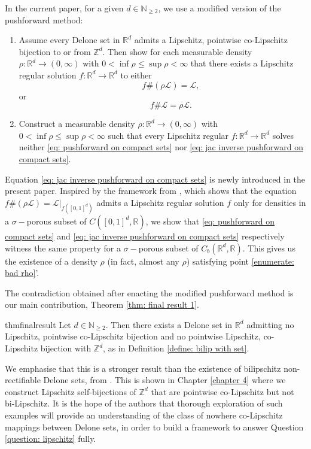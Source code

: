 \documentclass{article}
\newcommand{\R}{\mathbb{R}}
\newcommand{\Z}{\mathbb{Z}}
\newcommand{\N}{\mathbb{N}}
\newcommand{\leb}{\mc{L}}
\newcommand{\mc}[1]{\mathcal{#1}}
\begin{document}
In the current paper, for a given $d \in \N_{\geq 2}$, we use a modified version of the pushforward method:
\begin{enumerate}[(A')] 
    \item \label{enumerate: assumption} \label{enumerate: pushforward restriction} Assume every Delone set in $\R^d$ admits a Lipschitz, pointwise co-Lipschitz bijection to or from $\Z^d$.
    Then show for each measurable density $\rho:\R^d\to (0,\infty)$ with $0 < \inf \rho \leq \sup \rho < \infty$ that there exists a Lipschitz regular solution $f:\R^d \to \R^d$ to either
    \begin{equation} \label{eq: pushforward on compact sets}
        \qquad f\#(\rho \leb) = \leb,
    \end{equation} 
or 
 \begin{equation} \label{eq: jac inverse pushforward on compact sets}
        \qquad f\#\leb = \rho\leb.
    \end{equation}
    \item \label{enumerate: bad rho} Construct a measurable density $\rho:\R^d \to (0,\infty)$ with $0 < \inf \rho \leq \sup \rho < \infty$ such that every Lipschitz regular $f:\R^d \to \R^d$ solves neither \eqref{eq: pushforward on compact sets} nor \eqref{eq: jac inverse pushforward on compact sets}.
\end{enumerate}

Equation \eqref{eq: jac inverse pushforward on compact sets} is newly introduced in the present paper. Inspired by the framework from \cite{dymond2018mapping}, which shows that the equation $f\#(\rho \leb) = \leb|_{f([0,1]^d)}$ admits a Lipschitz regular solution $f$ only for densities in a $\sigma-$porous subset of $C([0,1]^d,\R)$, we show that \eqref{eq: pushforward on compact sets} and \eqref{eq: jac inverse pushforward on compact sets} respectively witness the same property for a $\sigma-$porous subset of $C_b(\R^d,\R)$. This gives us the existence of a density $\rho$ (in fact, almost any $\rho$) satisfying point \ref{enumerate: bad rho}'.

The contradiction obtained after enacting the modified pushforward method is our main contribution, Theorem \ref{thm: final result 1}.
\begin{restatable}{thm}{finalresult} \label{thm: final result 1}Let $d \in \N_{\geq 2}.$ Then there exists a Delone set in $\R^d$ admitting no Lipschitz, pointwise co-Lipschitz bijection and no pointwise Lipschitz, co-Lipschitz bijection with $\Z^d$, as in Definition \ref{define: bilip with set}.
\end{restatable} 
We emphasise that this is a stronger result than the existence of bilipschitz non-rectifiable Delone sets, from \cite{burago1998separated,mcmullen1998lipschitz}. This is shown in Chapter \ref{chapter 4} where we construct Lipschitz self-bijections of $\Z^d$ that are pointwise co-Lipschitz but not bi-Lipschitz. It is the hope of the authors that thorough exploration of such examples will provide an understanding of the class of nowhere co-Lipschitz mappings between Delone sets, in order to build a framework to answer Question \ref{question: lipschitz} fully. 
\end{document}

